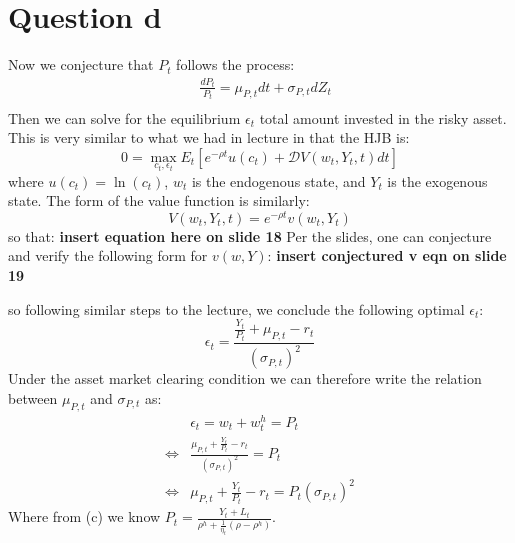 \documentclass{article}
\begin{document}
\section*{Question d}
Now we conjecture that $P_t$ follows the process:
\[
\begin{aligned}
    &\frac{d P_{t}}{P_{t}}=\mu_{P, t} d t+\sigma_{P, t} d Z_{t}\\
\end{aligned}
\]
Then we can solve for the equilibrium $\epsilon_t$ total amount invested in the risky asset. This is very similar to what we had in lecture in that the HJB is:
\[
0 = \max_{c_t, \epsilon_t}E_t[e^{-\rho t}u(c_t) + \mathcal{D} V(w_t, Y_t, t) d t]    
\]
where $u(c_t) = \ln(c_t) $, $w_t$ is the endogenous state, and $Y_t$ is the exogenous state. The form of the value function is similarly:
\[
V(w_t, Y_t, t) = e^{-\rho t} v(w_t, Y_t)    
\]
so that:
\textbf{insert equation here on slide 18} 
Per the slides, one can conjecture and verify the following form for $v(w, Y)$:
\textbf{insert conjectured v eqn on slide 19}

so following similar steps to the lecture, we conclude the following optimal $\epsilon_t$:
\[
\epsilon_t = \frac{\frac{Y_t}{P_t} + \mu_{P, t} - r_t}{(\sigma_{P, t})^2}    
\]
Under the asset market clearing condition we can therefore write the relation between $\mu_{P, t}$ and $\sigma_{P, t }$ as:
\[\begin{aligned}
   &\epsilon_t = w_t + w_t^h = P_t   \\ 
    \iff &\frac{ \mu_{P, t} + \frac{Y_t}{P_t} - r_t}{(\sigma_{P, t})^2} = P_t \\
    \iff & \mu_{P, t} + \frac{Y_t}{P_t} - r_t = P_t(\sigma_{P, t})^2
\end{aligned}\]
Where from (c) we know $P_t = \frac{Y_{t} + L_t}{\rho^h + \frac{1}{\eta_t}(\rho-\rho^h)}$.
\end{document}
